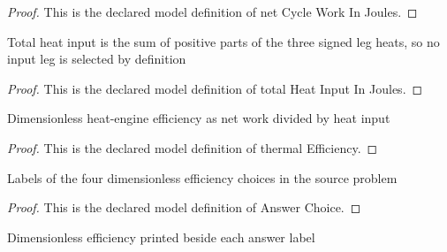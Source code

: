 \begin{proof}
  This is the declared model definition of net Cycle Work In Joules.
\end{proof}
\begin{definition}
  \label{def:physics:phyx-mini-0430:phyxminiproblems-problemphyxmini0430-totalheatinputinjoules}
  Total heat input is the sum of positive parts of the three signed leg heats, so no input leg is selected by definition
\end{definition}
\begin{proof}
  This is the declared model definition of total Heat Input In Joules.
\end{proof}
\begin{definition}
  \label{def:physics:phyx-mini-0430:phyxminiproblems-problemphyxmini0430-thermalefficiency}
  Dimensionless heat-engine efficiency as net work divided by heat input
\end{definition}
\begin{proof}
  This is the declared model definition of thermal Efficiency.
\end{proof}
\begin{definition}
  \label{def:physics:phyx-mini-0430:phyxminiproblems-problemphyxmini0430-answerchoice}
  Labels of the four dimensionless efficiency choices in the source problem
\end{definition}
\begin{proof}
  This is the declared model definition of Answer Choice.
\end{proof}
\begin{definition}
  \label{def:physics:phyx-mini-0430:phyxminiproblems-problemphyxmini0430-displayedefficiency}
  Dimensionless efficiency printed beside each answer label
\end{definition}
